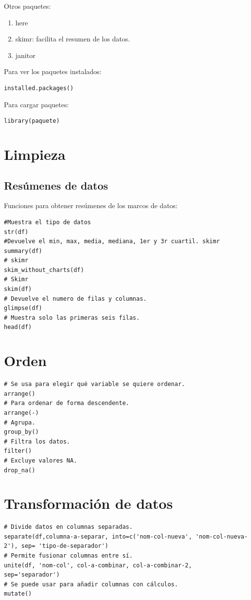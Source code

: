 \documentclass[a4paper, 12pt]{book}
\begin{document}
Otros paquetes:
\begin{enumerate}
\item here
\item skimr: facilita el resumen de los datos.
\item janitor
\end{enumerate}

Para ver los paquetes instalados:
\begin{verbatim}
installed.packages()
\end{verbatim}


Para cargar paquetes:
\begin{verbatim}
library(paquete)
\end{verbatim}
\section{Limpieza}
\subsection{Resúmenes de datos}
Funciones para obtener resúmenes de los marcos de datos:
\begin{verbatim}
#Muestra el tipo de datos
str(df)
#Devuelve el min, max, media, mediana, 1er y 3r cuartil. skimr
summary(df)
# skimr
skim_without_charts(df)
# Skimr
skim(df)
# Devuelve el numero de filas y columnas.
glimpse(df)
# Muestra solo las primeras seis filas.
head(df)
\end{verbatim}
\section{Orden}
\begin{verbatim}
# Se usa para elegir qué variable se quiere ordenar.
arrange()
# Para ordenar de forma descendente.
arrange(-)
# Agrupa.
group_by()
# Filtra los datos.
filter()
# Excluye valores NA.
drop_na()
\end{verbatim}
\section{Transformación de datos}
\begin{verbatim}
# Divide datos en columnas separadas.
separate(df,columna-a-separar, into=c('nom-col-nueva', 'nom-col-nueva-2'), sep= 'tipo-de-separador')
# Permite fusionar columnas entre sí.
unite(df, 'nom-col', col-a-combinar, col-a-combinar-2, sep='separador')
# Se puede usar para añadir columnas con cálculos.
mutate()
\end{verbatim}
\end{document}
